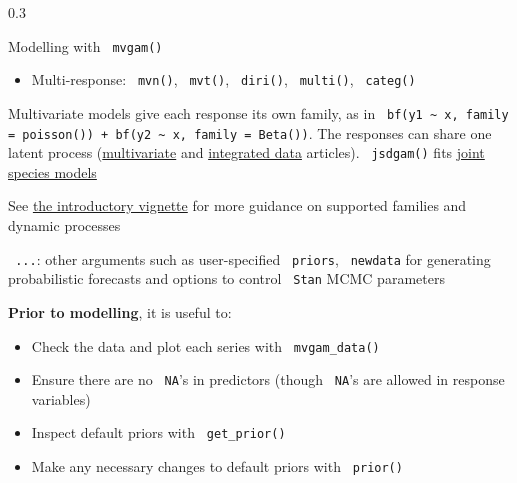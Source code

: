 \documentclass[final,9pt,fleqn]{beamer}\usepackage[]{graphicx}\usepackage[]{xcolor}
\begin{document}
\begin{frame}[fragile]
\begin{columns}
\begin{column}{0.3\paperwidth}
\begin{block}{{\fontsize{21}{21} \selectfont \color{BrickRed} Modelling with \texttt{\color{Orchid} mvgam()}}}
\begin{itemize}
\item Multi-response: \texttt{\color{Orchid} mvn()}, \texttt{\color{Orchid} mvt()}, \texttt{\color{Orchid} diri()}, \texttt{\color{Orchid} multi()}, \texttt{\color{Orchid} categ()}
\end{itemize}
Multivariate models give each response its own family, as in \texttt{\color{Orchid} bf(y1 \textasciitilde{} x, family = poisson()) + bf(y2 \textasciitilde{} x, family = Beta())}. The responses can share one latent process (\href{https://nicholasjclark.github.io/mvgam/articles/mvbf.html}{multivariate} and \href{https://nicholasjclark.github.io/mvgam/articles/idm.html}{integrated data} articles). \texttt{\color{Orchid} jsdgam()} fits \href{https://nicholasjclark.github.io/mvgam/articles/jsdgam.html}{joint species models}

\medskip
See \href{https://nicholasjclark.github.io/mvgam/articles/mvgam_overview.html}{the introductory vignette} for more guidance on supported families and dynamic processes

\medskip
\texttt{\color{Orchid} ...}: other arguments such as user-specified \texttt{\color{Orchid} priors}, \texttt{\color{Orchid} newdata} for generating probabilistic forecasts and options to control \texttt{\color{Orchid} Stan} MCMC parameters

\medskip
\textbf{\color{BrickRed} Prior to modelling}, it is useful to:
\begin{itemize}

\item Check the data and plot each series with \texttt{\color{Orchid} mvgam\_data()}

\item Ensure there are no \texttt{\color{Orchid} NA}'s in predictors (though \texttt{\color{Orchid} NA}'s are allowed in response variables)

\item Inspect default priors with \texttt{\color{Orchid} get\_prior()}

\item Make any necessary changes to default priors with \texttt{\color{Orchid} prior()}

\end{itemize}


\end{block}
\end{column}
\end{columns}
\end{frame}
\end{document}
